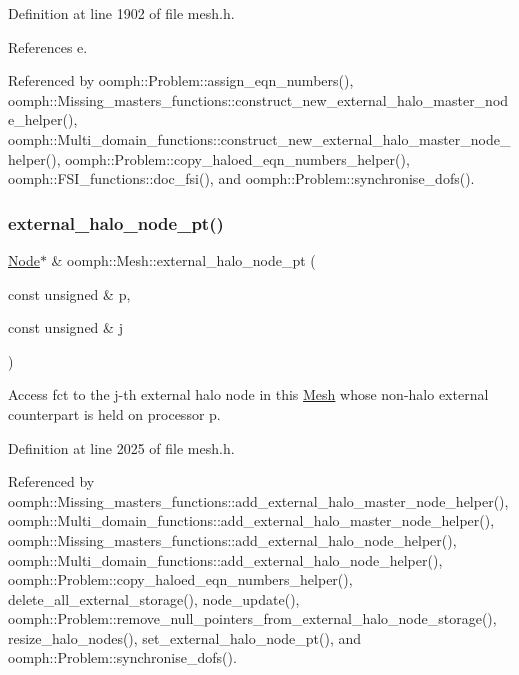 Definition at line 1902 of file mesh.\+h.



References e.



Referenced by oomph\+::\+Problem\+::assign\+\_\+eqn\+\_\+numbers(), oomph\+::\+Missing\+\_\+masters\+\_\+functions\+::construct\+\_\+new\+\_\+external\+\_\+halo\+\_\+master\+\_\+node\+\_\+helper(), oomph\+::\+Multi\+\_\+domain\+\_\+functions\+::construct\+\_\+new\+\_\+external\+\_\+halo\+\_\+master\+\_\+node\+\_\+helper(), oomph\+::\+Problem\+::copy\+\_\+haloed\+\_\+eqn\+\_\+numbers\+\_\+helper(), oomph\+::\+F\+S\+I\+\_\+functions\+::doc\+\_\+fsi(), and oomph\+::\+Problem\+::synchronise\+\_\+dofs().

\mbox{\label{classoomph_1_1Mesh_a37ba13e88361aa90d5052db4835ddff3}} 
\subsubsection{\texorpdfstring{external\+\_\+halo\+\_\+node\+\_\+pt()}{external\_halo\_node\_pt()}\hspace{0.1cm}{\footnotesize\ttfamily [1/2]}}
{\footnotesize\ttfamily \hyperlink{classoomph_1_1Node}{Node}$\ast$ \& oomph\+::\+Mesh\+::external\+\_\+halo\+\_\+node\+\_\+pt (\begin{DoxyParamCaption}\item[{const unsigned \&}]{p,  }\item[{const unsigned \&}]{j }\end{DoxyParamCaption})\hspace{0.3cm}{\ttfamily [inline]}}



Access fct to the j-\/th external halo node in this \hyperlink{classoomph_1_1Mesh}{Mesh} whose non-\/halo external counterpart is held on processor p. 



Definition at line 2025 of file mesh.\+h.



Referenced by oomph\+::\+Missing\+\_\+masters\+\_\+functions\+::add\+\_\+external\+\_\+halo\+\_\+master\+\_\+node\+\_\+helper(), oomph\+::\+Multi\+\_\+domain\+\_\+functions\+::add\+\_\+external\+\_\+halo\+\_\+master\+\_\+node\+\_\+helper(), oomph\+::\+Missing\+\_\+masters\+\_\+functions\+::add\+\_\+external\+\_\+halo\+\_\+node\+\_\+helper(), oomph\+::\+Multi\+\_\+domain\+\_\+functions\+::add\+\_\+external\+\_\+halo\+\_\+node\+\_\+helper(), oomph\+::\+Problem\+::copy\+\_\+haloed\+\_\+eqn\+\_\+numbers\+\_\+helper(), delete\+\_\+all\+\_\+external\+\_\+storage(), node\+\_\+update(), oomph\+::\+Problem\+::remove\+\_\+null\+\_\+pointers\+\_\+from\+\_\+external\+\_\+halo\+\_\+node\+\_\+storage(), resize\+\_\+halo\+\_\+nodes(), set\+\_\+external\+\_\+halo\+\_\+node\+\_\+pt(), and oomph\+::\+Problem\+::synchronise\+\_\+dofs().

